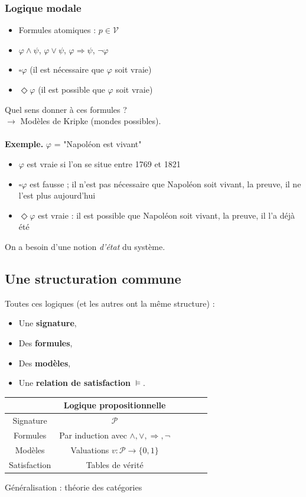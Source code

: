 \documentclass{beamer}
\newcommand{\itemz}{\item[$\triangleright$]}
\begin{document}
\begin{frame}
\frametitle{Logique modale}
\begin{itemize}
\itemz Formules atomiques : $p \in \mathcal{V}$ \pause
\itemz $\varphi \wedge \psi$, $\varphi \vee \psi$, $\varphi \Rightarrow \psi$, $\neg \varphi$ \pause
\itemz $\square \varphi$ (il est nécessaire que $\varphi$ soit vraie) \pause
\itemz $\Diamond \varphi$ (il est possible que $\varphi$ soit vraie) \pause
\end{itemize}
\pause
Quel sens donner à ces formules ? \pause \\ $\longrightarrow$ Modèles de Kripke (mondes possibles). \pause \\~\\
\textbf{Exemple.} $\varphi$ = "Napoléon est vivant" \pause
\begin{itemize}
\itemz $\varphi$ \pause est vraie si l'on se situe entre 1769 et 1821 \pause
\itemz $\square \varphi$ \pause est fausse ; il n'est pas nécessaire que Napoléon soit vivant, la preuve, il ne l'est plus aujourd'hui \pause
\itemz $\Diamond \varphi$ \pause est vraie : il est possible que Napoléon soit vivant, la preuve, il l'a déjà été \pause
\end{itemize}
On a besoin d'une notion \textit{d'état} du système.

\end{frame}

\subsection{Une structuration commune}

\begin{frame}
Toutes ces logiques (et les autres ont la même structure) :
\begin{itemize}
\itemz Une \textbf{signature},
\itemz Des \textbf{formules},
\itemz Des \textbf{modèles},
\itemz Une \textbf{relation de satisfaction} $\models$.
\end{itemize}
\pause
\begin{center}
\begin{tabular}{|c|c|c|c|c|c|}
  \hline
  & Logique propositionnelle \\
  \hline
  Signature & $\mathcal{P}$  \\ 
  Formules & Par induction avec $\wedge,\vee,\Rightarrow,\neg$ \\
  Modèles & Valuations $v : \mathcal{P} \to \{ 0 , 1 \}$  \\
  Satisfaction & Tables de vérité \\
  \hline
\end{tabular}
\end{center}
\pause
Généralisation : théorie des catégories
\end{frame}
\end{document}
